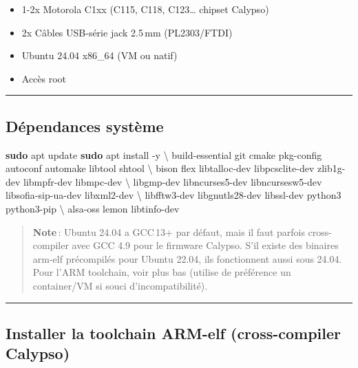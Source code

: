 \documentclass[
  french,
]{article}
\newenvironment{Shaded}{\begin{snugshade}}{\end{snugshade}}
\newcommand{\AttributeTok}[1]{\textcolor[rgb]{0.13,0.29,0.53}{#1}}
\newcommand{\DataTypeTok}[1]{\textcolor[rgb]{0.13,0.29,0.53}{#1}}
\newcommand{\FunctionTok}[1]{\textcolor[rgb]{0.13,0.29,0.53}{\textbf{#1}}}
\newcommand{\NormalTok}[1]{#1}
\providecommand{\tightlist}{%
  \setlength{\itemsep}{0pt}\setlength{\parskip}{0pt}}
\begin{document}
\begin{itemize}
\tightlist
\item
  1-2x Motorola C1xx (C115, C118, C123\ldots{} chipset Calypso)
\item
  2x Câbles USB-série jack 2.5\,mm (PL2303/FTDI)
\item
  Ubuntu 24.04 x86\_64 (VM ou natif)
\item
  Accès root
\end{itemize}

\begin{center}\rule{0.5\linewidth}{0.5pt}\end{center}

\subsection{Dépendances système}\label{duxe9pendances-systuxe8me-1}

\begin{Shaded}
\begin{Highlighting}[]
\FunctionTok{sudo}\NormalTok{ apt update}
\FunctionTok{sudo}\NormalTok{ apt install }\AttributeTok{{-}y} \DataTypeTok{\textbackslash{}}
\NormalTok{  build{-}essential git cmake pkg{-}config autoconf automake libtool shtool }\DataTypeTok{\textbackslash{}}
\NormalTok{  bison flex libtalloc{-}dev libpcsclite{-}dev zlib1g{-}dev libmpfr{-}dev libmpc{-}dev }\DataTypeTok{\textbackslash{}}
\NormalTok{  libgmp{-}dev libncurses5{-}dev libncursesw5{-}dev libsofia{-}sip{-}ua{-}dev libxml2{-}dev }\DataTypeTok{\textbackslash{}}
\NormalTok{  libfftw3{-}dev libgnutls28{-}dev libssl{-}dev python3 python3{-}pip }\DataTypeTok{\textbackslash{}}
\NormalTok{  alsa{-}oss lemon libtinfo{-}dev}
\end{Highlighting}
\end{Shaded}

\begin{quote}
\textbf{Note}\,: Ubuntu 24.04 a GCC\,13+ par défaut, mais il faut
parfois cross-compiler avec GCC 4.9 pour le firmware Calypso. S'il
existe des binaires arm-elf précompilés pour Ubuntu 22.04, ils
fonctionnent aussi sous 24.04. Pour l'ARM toolchain, voir plus bas
(utilise de préférence un container/VM si souci d'incompatibilité).
\end{quote}

\begin{center}\rule{0.5\linewidth}{0.5pt}\end{center}

\subsection{Installer la toolchain ARM-elf (cross-compiler
Calypso)}\label{installer-la-toolchain-arm-elf-cross-compiler-calypso}
\end{document}
